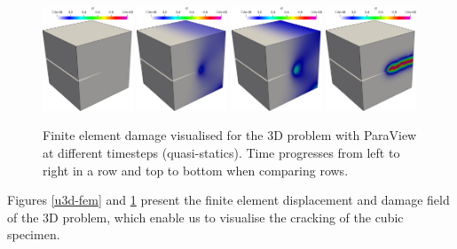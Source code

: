 \begin{figure}[h!]
\centering

\includegraphics[width=0.24\textwidth]{./Images/d3d0.png}
\includegraphics[width=0.24\textwidth]{./Images/d3d1.png}
\includegraphics[width=0.24\textwidth]{./Images/d3d2.png}
\includegraphics[width=0.24\textwidth]{./Images/d3d3.png}
\caption{Finite element damage visualised for the 3D problem with ParaView at different timesteps (quasi-statics). Time progresses from left to right in a row and top to bottom when comparing rows. \label{d3d-fem}}
\end{figure}

Figures \ref{u3d-fem} and \ref{d3d-fem} present the finite element
displacement and damage field of the 3D problem, which enable us to
visualise the cracking of the cubic specimen.

